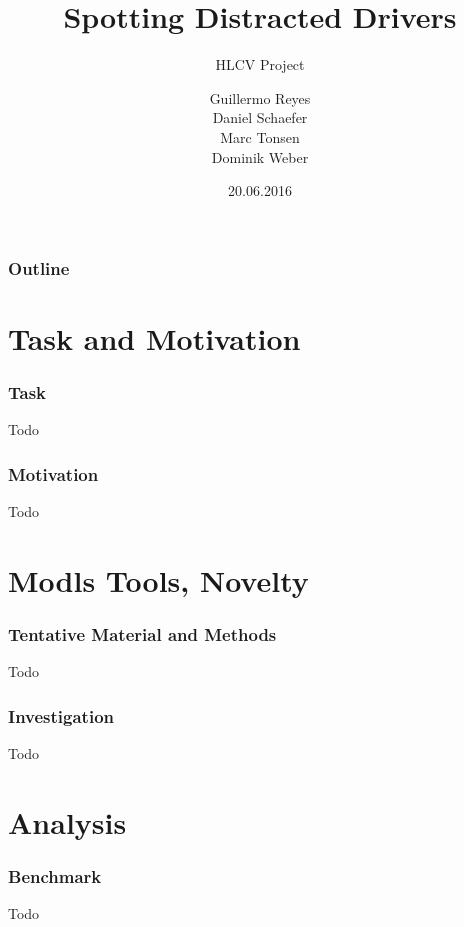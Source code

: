 \documentclass{beamer}
\title{Spotting Distracted Drivers}
\subtitle{HLCV Project}
\author{ Guillermo Reyes \\
	 Daniel Schaefer \\
	 Marc Tonsen \\
	 Dominik Weber\\}
\institute{Saarland University}
\date{20.06.2016}
\begin{document}
	\begin{frame}
		\titlepage
	\end{frame}
	
	\begin{frame}
		\frametitle{Outline}
		\tableofcontents
	\end{frame}
	
	\section{Task and Motivation}	
	\begin{frame}
		\frametitle{Task}
		Todo
	\end{frame}
	
	\begin{frame}
		\frametitle{Motivation}
		Todo
	\end{frame}
	
	\section{Modls Tools, Novelty}	
	\begin{frame}
		\frametitle{Tentative Material and Methods}
		Todo
	\end{frame}	
	
	\begin{frame}
		\frametitle{Investigation}
		Todo
	\end{frame}
	
	\section{Analysis}	
	\begin{frame}
		\frametitle{Benchmark}
		Todo
	\end{frame}
	
		
\end{document}
